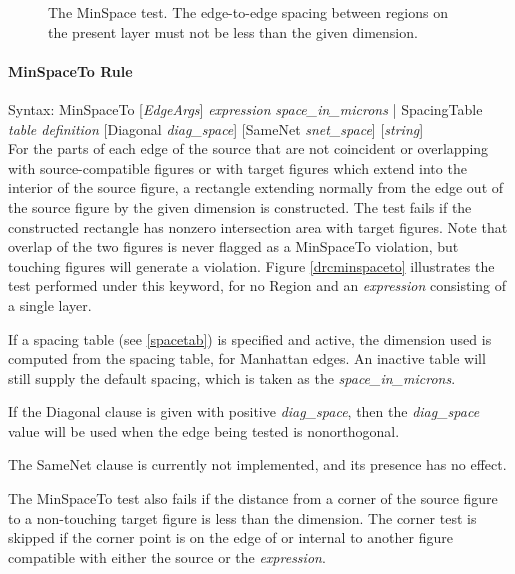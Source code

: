 \begin{figure}
\caption{\label{drcminspace} The {\et MinSpace} test.  The edge-to-edge
spacing between regions on the present layer must not be less than
the given dimension.}
\vspace{1.5ex}
\begin{center}
\end{center}
\end{figure}

\paragraph{{\et MinSpaceTo} Rule}

\begin{description}
\item{Syntax: {\vt MinSpaceTo} [{\it EdgeArgs\/}]
   {\it expression}
   {\it space\_in\_microns} {\vt |} {\vt SpacingTable} {\it table definition}
   [{\vt Diagonal} {\it diag\_space\/}]
   [{\vt SameNet} {\it snet\_space\/}] [{\it string\/}] }\\

For the parts of each edge of the source that are not coincident or
overlapping with source-compatible figures or with target figures
which extend into the interior of the source figure, a rectangle
extending normally from the edge out of the source figure by the given
dimension is constructed.  The test fails if the constructed rectangle
has nonzero intersection area with target figures.  Note that overlap
of the two figures is never flagged as a {\et MinSpaceTo} violation,
but touching figures will generate a violation.  Figure
\ref{drcminspaceto} illustrates the test performed under this keyword,
for no {\et Region} and an {\it expression} consisting of a single
layer.

If a spacing table (see \ref{spacetab}) is specified and active, the
dimension used is computed from the spacing table, for Manhattan
edges.  An inactive table will still supply the default spacing, which
is taken as the {\it space\_in\_microns\/}.

If the {\vt Diagonal} clause is given with positive {\it diag\_space},
then the {\it diag\_space} value will be used when the edge being
tested is nonorthogonal.

The {\vt SameNet} clause is currently not implemented, and its
presence has no effect.

The {\et MinSpaceTo} test also fails if the distance from a corner of
the source figure to a non-touching target figure is less than the
dimension.  The corner test is skipped if the corner point is on the
edge of or internal to another figure compatible with either the
source or the {\it expression}.


\end{description}
